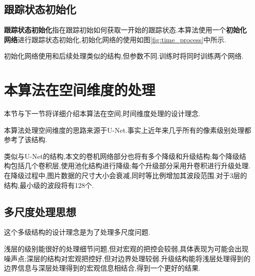 \subsection{跟踪状态初始化}
\textbf{跟踪状态初始化}指在跟踪初始如何获取一开始的跟踪状态.本算法使用一个\textbf{初始化网络}进行跟踪状态初始化,初始化网络的使用如图\ref{fig:time_process}中所示.
\par
初始化网络使用和后续处理类似的结构,但参数不同.训练时将同时训练两个网络.

\section{本算法在空间维度的处理}
本节与下一节将详细介绍本算法在空间,时间维度处理的设计理念.
\par
本算法处理空间维度的思路来源于U-Net\supercite{ronneberger2015u}.事实上近年来几乎所有的像素级别处理都参考了该结构.
\par
类似与U-Net的结构,本文的卷机网络部分也将有多个降级和升级结构;每个降级结构包括几个卷积层,使用池化结构进行降级;每个升级部分采用升卷积进行升级处理.在降级过程中,图片数据的尺寸大小会衰减,同时等比例增加其波段范围.对于3层的结构,最小级的波段将有128个.

\subsection{多尺度处理思想} \label{section:multiscale}
这个多级结构的设计理念是为了处理多尺度问题.
\par
浅层的级别能很好的处理细节问题,但对宏观的把控会较弱,具体表现为可能会出现噪声点;深层的结构对宏观把控好,但对边界处理较弱.升级结构能将浅层处理得到的边界信息与深层处理得到的宏观信息相结合,得到一个更好的结果.